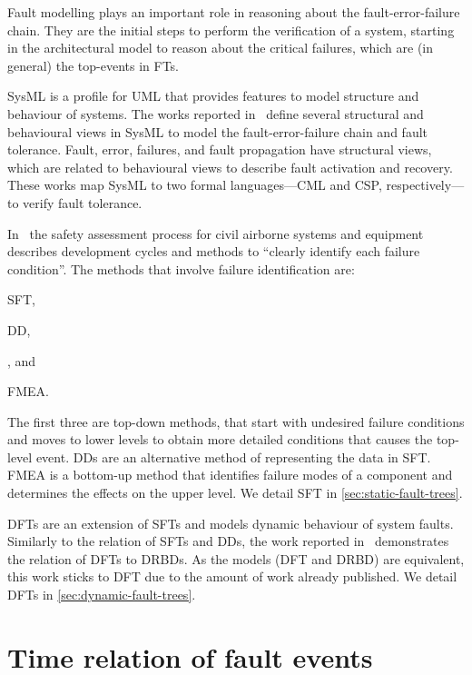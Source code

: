 Fault modelling plays an important role in reasoning about the fault-error-failure chain.
They are the initial steps to perform the verification of a system, starting in the architectural model to reason about the critical failures, which are (in general) the top-events in \acp{FT}.

\Ac{SysML} is a profile for \ac{UML} that provides features to model structure and behaviour of systems.
The works reported in~\cite{APR+2013,ADP+2013} define several structural and behavioural views in \ac{SysML} to model the fault-error-failure chain and fault tolerance.
Fault, error, failures, and fault propagation have structural views, which are related to behavioural views to describe fault activation and recovery.
These works map \ac{SysML} to two formal languages---\ac{CML} and \ac{CSP}, respectively---to verify fault tolerance.

In~\cite{SAE1996b} the safety assessment process for civil airborne systems and equipment describes development cycles and methods to ``clearly identify each failure condition''.
The methods that involve failure identification are:
\begin{alineasinline}
  \item \ac{SFT},
  \item \ac{DD},
  \item {}, and
  \item \ac{FMEA}.
\end{alineasinline}
The first three are top-down methods, that start with undesired failure conditions and moves to lower levels to obtain more detailed conditions that causes the top-level event.
\Acp{DD} are an alternative method of representing the data in \ac{SFT}.
\Ac{FMEA} is a bottom-up method that identifies failure modes of a component and determines the effects on the upper level.
We detail \ac{SFT} in \cref{sec:static-fault-trees}.

\Acp{DFT} are an extension of \acp{SFT} and models dynamic behaviour of system faults.
Similarly to the relation of \acp{SFT} and \acp{DD}, the work reported in~\cite{DP2009} demonstrates the relation of \acp{DFT} to \acp{DRBD}.
As the models (\ac{DFT} and \ac{DRBD}) are equivalent, this work sticks to \ac{DFT} due to the amount of work already published.
We detail \acp{DFT} in \cref{sec:dynamic-fault-trees}.

\section{Time relation of fault events}
\label{sec:time-relations}

